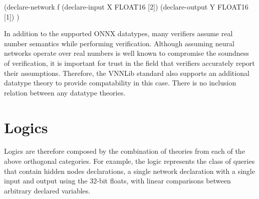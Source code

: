 \begin{code}[style=lbnf]
(declare-network f
    (declare-input  X FLOAT16 [2])
    (declare-output Y FLOAT16 [1])
)
\end{code}

In addition to the supported ONNX datatypes, many verifiers assume real number semantics while performing verification. Although assuming neural networks operate over real numbers is well known to compromise the soundness of verification, it is important for trust in the field that verifiers accurately report their assumptions. Therefore, the VNNLib standard also supports an additional datatype theory  to provide compatability in this case.  There is no inclusion relation between any datatype theories.


\section{Logics}

Logics are therefore composed by the combination of theories from each of the above orthogonal categories. For example, the logic  represents the class of queries that contain hidden nodes declarations, a single network declaration with a single input and output using the 32-bit floats, with linear comparisons between arbitrary declared variables.

